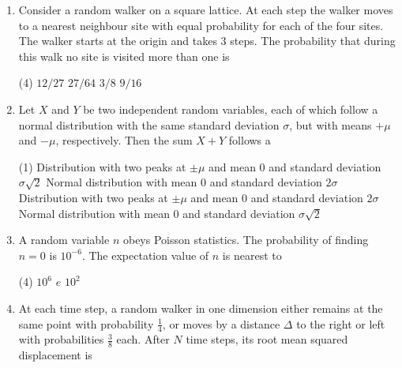 \begin{enumerate}[label=\color{ocre}\textbf{\arabic*.}]
{}
\begin{tasks}(1)
	\task[\textbf{A.}]  The probability distribution of the random variable $l=m+n$ is a binomial distribution.
	\task[\textbf{B.}] The probability distribution of the random variable $r=m-n$ is also a Poisson distribution.
	\task[\textbf{C.}] The variance of the random variable $l=m+n$ is equal to $\mu+v$
	\task[\textbf{D.}] The mean value of the random variable $r=m-n$ is equal to 0 
\end{tasks}
\item  Consider a random walker on a square lattice. At each step the walker moves to a nearest neighbour site with equal probability for each of the four sites. The walker starts at the origin and takes 3 steps. The probability that during this walk no site is visited more than one is
{}
\begin{tasks}(4)
	\task[\textbf{A.}] $12 / 27$
	\task[\textbf{B.}] $27 / 64$
	\task[\textbf{C.}] $3 / 8$
	\task[\textbf{D.}] $9 / 16$
\end{tasks}
\item  Let $X$ and $Y$ be two independent random variables, each of which follow a normal distribution with the same standard deviation $\sigma$, but with means $+\mu$ and $-\mu$, respectively. Then the sum $X+Y$ follows a
{}
\begin{tasks}(1)
	\task[\textbf{A.}] Distribution with two peaks at $\pm \mu$ and mean 0 and standard deviation $\sigma \sqrt{2}$
	\task[\textbf{B.}]  Normal distribution with mean 0 and standard deviation $2 \sigma$
	\task[\textbf{C.}] Distribution with two peaks at $\pm \mu$ and mean 0 and standard deviation $2 \sigma$
	\task[\textbf{D.}] Normal distribution with mean 0 and standard deviation $\sigma \sqrt{2}$
\end{tasks}
\item  A random variable $n$ obeys Poisson statistics. The probability of finding $n=0$ is $10^{-6}$. The expectation value of $n$ is nearest to
{}
\begin{tasks}(4)
	\task[\textbf{B.}] $10^{6}$
	\task[\textbf{C.}] $e$
	\task[\textbf{D.}] $10^{2}$
\end{tasks}
\item At each time step, a random walker in one dimension either remains at the same point with probability $\frac{1}{4}$, or moves by a distance $\Delta$ to the right or left with probabilities $\frac{3}{8}$ each. After $N$ time steps, its root mean squared displacement is

\end{enumerate}
